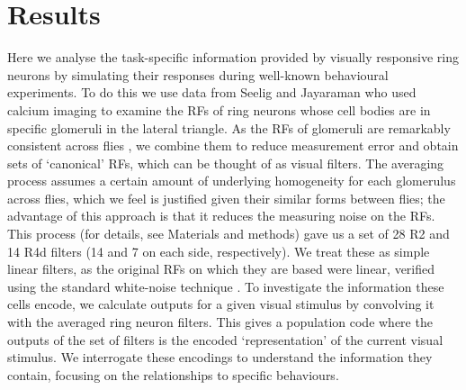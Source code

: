 \section*{Results}
Here we analyse the task-specific information provided by visually responsive ring neurons by simulating their responses during well-known behavioural experiments. To do this we use data from Seelig and Jayaraman \cite{Seelig2013} who used calcium imaging to examine the \acp{RF} of ring neurons whose cell bodies are in specific glomeruli in the lateral triangle. As the \acp{RF} of glomeruli are remarkably consistent across flies \cite{Seelig2013}, we combine them to reduce measurement error and obtain sets of ‘canonical’ \acp{RF}, which can be thought of as visual filters.
The averaging process assumes a certain amount of underlying homogeneity for each glomerulus across flies, which we feel is justified given their similar forms between flies;
the advantage of this approach is that it reduces the measuring noise on the RFs.
This process (for details, see Materials and methods) gave us a set of 28 R2 and 14 R4d filters (14 and 7 on each side, respectively).
We treat these as simple linear filters, as the original RFs on which they are based were linear, verified using the standard white-noise technique \cite{Seelig2013}.
To investigate the information these cells encode, we calculate outputs for a given visual stimulus by convolving it with the averaged ring neuron filters. This gives a population code where the outputs of the set of filters is the encoded ‘representation’ of the current visual stimulus. We interrogate these encodings to understand the information they contain, focusing on the relationships to specific behaviours.

